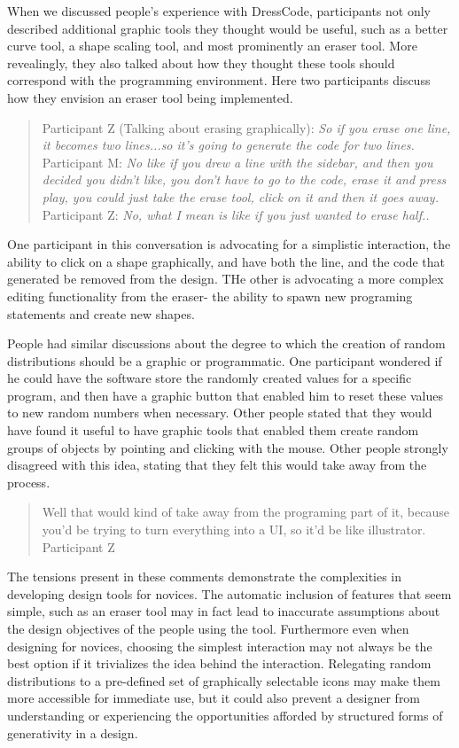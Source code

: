 \documentclass{sigchi}
\begin{document}
When we discussed people's experience with DressCode, participants not only described additional graphic tools they thought would be useful, such as a better curve tool, a shape scaling tool, and most prominently an eraser tool. More revealingly, they also talked about how they thought these tools should correspond with the programming environment. Here two participants discuss how they envision an eraser tool being implemented.

\begin{quote}
Participant Z (Talking about erasing graphically): \textit{So if you erase one line, it becomes two lines...so it's going to generate the code for two lines.}
Participant M: \textit{No like if you drew a line with the sidebar, and then you decided you didn't like, you don't have to go to the code, erase it and press play, you could just take the erase tool, click on it and then it goes away.}
Participant Z: \textit{No, what I mean is like if you just wanted to erase half..}
\end{quote}

One participant in this conversation is advocating for a simplistic interaction, the ability to click on a shape graphically, and have both the line, and the code that generated be removed from the design. THe other is advocating a more complex editing functionality from the eraser- the ability to spawn new programing statements and create new shapes. 

People had similar discussions about the degree to which the creation of random distributions should be a graphic or programmatic. One participant wondered if he could have the software store the randomly created values for a specific program, and then have a graphic button that enabled him to reset these values to new random numbers when necessary. Other people stated that they would have found it useful to have graphic tools that enabled them create random groups of objects by pointing and clicking with the mouse. Other people strongly disagreed with this idea, stating that they felt this would take away from the process.

\begin{quote}
 Well that would kind of take away from the programing part of it, because you’d be trying to turn everything into a UI, so it'd be like illustrator.
 \\Participant Z
\end{quote}

The tensions present in these comments demonstrate the complexities in developing design tools for novices. The automatic inclusion of features that seem simple, such as an eraser tool may in fact lead to inaccurate assumptions about the design objectives of the people using the tool. Furthermore even when designing for novices, choosing the simplest interaction may not always be the best option if it trivializes the idea behind the interaction. Relegating random distributions to a pre-defined set of graphically selectable icons may make them more accessible for immediate use, but it could also prevent a designer from understanding or experiencing the opportunities afforded by structured forms of generativity in a design. 
\end{document}
